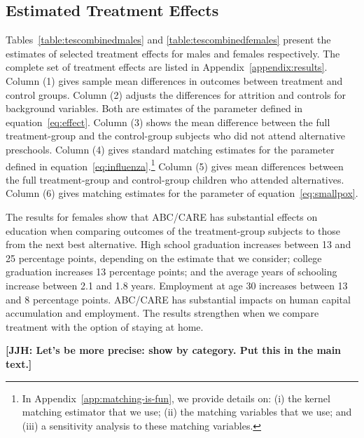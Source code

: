 \subsection{Estimated Treatment Effects}

Tables~\ref{table:tescombinedmales} and \ref{table:tescombinedfemales} present the estimates of selected treatment effects for males and females respectively. The complete set of treatment effects are listed in Appendix~\ref{appendix:results}. Column (1) gives sample mean differences in outcomes between treatment and control groups. Column (2) adjusts the differences for attrition and controls for background variables. Both are estimates of the parameter defined in equation~\eqref{eq:effect}. Column (3) shows the mean difference between the full treatment-group and the control-group subjects who did not attend alternative preschools. Column (4) gives standard matching estimates for the parameter defined in equation~\eqref{eq:influenza}.\footnote{In Appendix~\ref{app:matching-is-fun}, we provide details on: (i) the kernel matching estimator that we use; (ii) the matching variables that we use; and (iii) a sensitivity analysis to these matching variables.} Column (5) gives mean differences between the full treatment-group and control-group children who attended alternatives. Column (6) gives matching estimates for the parameter of equation~\eqref{eq:smallpox}.

The results for females show that ABC/CARE has substantial effects on education when comparing outcomes of the treatment-group subjects to those from the next best alternative. High school graduation increases between 13 and 25 percentage points, depending on the estimate that we consider; college graduation increases 13 percentage points; and the average years of schooling increase between 2.1 and 1.8 years. Employment at age 30 increases between 13 and 8 percentage points. ABC/CARE has substantial impacts on human capital accumulation and employment. The results strengthen when we compare treatment with the option of staying at home.

\textbf{[JJH: Let's be more precise: show by category. Put this in the main text.]}


